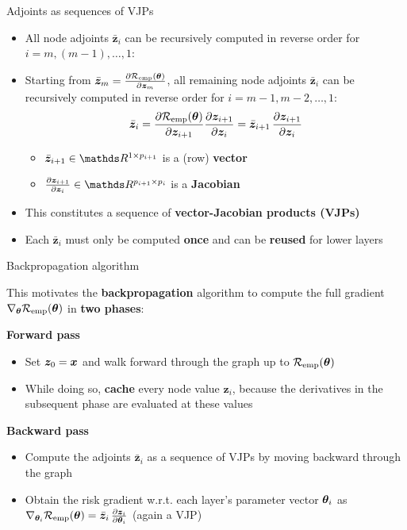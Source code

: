 \documentclass[11pt,compress,t,notes=noshow, xcolor=table]{beamer}
\newcommand{\zv}{\bm{z}}                 %
\newcommand{\adj}[1]{\bar{\bm{z}}_{#1}}  %
\begin{document}
\begin{framev}{Adjoints as sequences of VJPs}
\begin{itemize}
\item All node adjoints $\adj{i}$ can be recursively computed in reverse order for $i = m, (m-1), \ldots, 1$:
\item Starting from $\adj{m} = \pd{\risket}{\zv_m}$, all remaining node adjoints $\adj{i}$ can be recursively computed in reverse order for $i = m-1, m-2, \ldots, 1$:
$$
\adj{i} = \pd{\risket}{\zv_{i+1}} \pd{\zv_{i+1}}{\zv_i} = \adj{i+1} \, \pd{\zv_{i+1}}{\zv_i}
$$
\begin{itemize}
  \item $\adj{i+1} \in \R^{1 \times p_{i+1}}$ is a (row) \textbf{vector}
  \item $\pd{\zv_{i+1}}{\zv_i} \in \R^{p_{i+1} \times p_i}$ is a \textbf{Jacobian}
\end{itemize}
\item[$\Rightarrow$] This constitutes a sequence of \textbf{vector-Jacobian products (VJPs)}
\item[$\Rightarrow$] Each $\adj{i}$ must only be computed \textbf{once} and can be \textbf{reused} for lower layers
\end{itemize}
\end{framev}


\begin{framei}{Backpropagation algorithm}
\item This motivates the \textbf{backpropagation} algorithm to compute the full gradient $\nabla_{\bm{\theta}} \mathcal{R}_{\text{emp}}(\bm{\theta})$ in \textbf{two phases}:
%
\item \textbf{Forward pass}
\begin{itemize}
  \item Set $\zv_0 = \xv$ and walk forward through the graph up to $\mathcal{R}_{\text{emp}}(\bm{\theta})$ %
  \item While doing so, \textbf{cache} every node value $\zv_i$, because the derivatives in the subsequent phase are evaluated at these values
\end{itemize}
\item \textbf{Backward pass}
\begin{itemize}
\item Compute the adjoints $\adj{i}$ as a sequence of VJPs by moving backward through the graph
\item Obtain the risk gradient w.r.t. each layer's parameter vector $\bm{\theta}_i$ as $\nabla_{\thetav_i} \risket = \adj{i} \, \pd{\zv_i}{\thetav_i}$ (again a VJP)
\end{itemize}
\end{framei}
\end{document}
